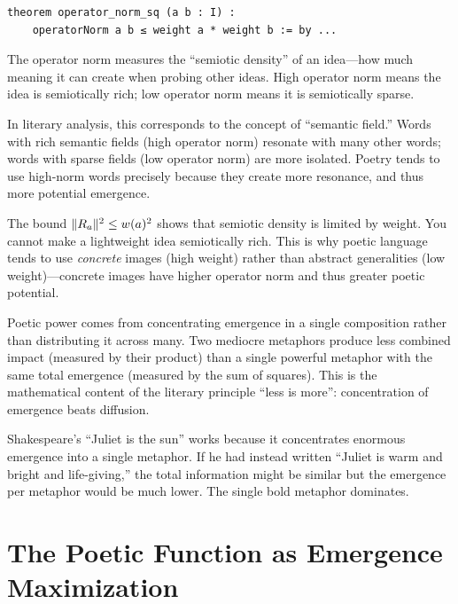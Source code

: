 \begin{lstlisting}[caption={Operator norm (IDT\_v3\_Emergence.lean)}]
theorem operator_norm_sq (a b : I) :
    operatorNorm a b ≤ weight a * weight b := by ...
\end{lstlisting}

\begin{interpretation}
The operator norm measures the ``semiotic density'' of an idea---how much meaning
it can create when probing other ideas. High operator norm means the idea is
semiotically rich; low operator norm means it is semiotically sparse.

In literary analysis, this corresponds to the concept of ``semantic field.''
Words with rich semantic fields (high operator norm) resonate with many other
words; words with sparse fields (low operator norm) are more isolated. Poetry
tends to use high-norm words precisely because they create more resonance, and
thus more potential emergence.

The bound $\|R_a\|^2 \leq w(a)^2$ shows that semiotic density is limited
by weight. You cannot make a lightweight idea semiotically rich. This is why
poetic language tends to use \emph{concrete} images (high weight) rather than
abstract generalities (low weight)---concrete images have higher operator norm
and thus greater poetic potential.
\end{interpretation}

\begin{remark}
Poetic power comes from concentrating emergence in a single composition
rather than distributing it across many. Two mediocre metaphors produce less
combined impact (measured by their product) than a single powerful metaphor with
the same total emergence (measured by the sum of squares). This is the
mathematical content of the literary principle ``less is more'': concentration
of emergence beats diffusion.

Shakespeare's ``Juliet is the sun'' works because it concentrates enormous
emergence into a single metaphor. If he had instead written ``Juliet is warm
and bright and life-giving,'' the total information might be similar but the
emergence per metaphor would be much lower. The single bold metaphor dominates.
\end{remark}


\section{The Poetic Function as Emergence Maximization}

